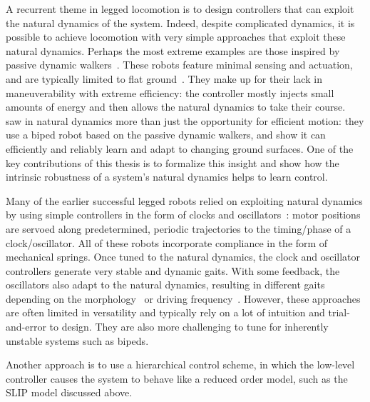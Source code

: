 
A recurrent theme in legged locomotion is to design controllers that can exploit the natural dynamics of the system. Indeed, despite complicated dynamics, it is possible to achieve locomotion with very simple approaches that exploit these natural dynamics.
Perhaps the most extreme examples are those inspired by passive dynamic walkers~\cite{mcgeer1990passive}. These robots feature minimal sensing and actuation, and are typically limited to flat ground~\cite{bhounsule2012design,wisse2006design}. They make up for their lack in maneuverability with extreme efficiency: the controller mostly injects small amounts of energy and then allows the natural dynamics to take their course.~\textcite{tedrake2005learning} saw in natural dynamics more than just the opportunity for efficient motion: they use a biped robot based on the passive dynamic walkers, and show it can efficiently and reliably learn and adapt to changing ground surfaces. One of the key contributions of this thesis is to formalize this insight and show how the intrinsic robustness of a system's natural dynamics helps to learn control. \par
Many of the earlier successful legged robots relied on exploiting natural dynamics by using simple controllers in the form of clocks and oscillators~\cite{sprowitz2013towards,buchli2006resonance,altendorfer2001rhex,owaki2013simple}: motor positions are servoed along predetermined, periodic trajectories to the timing/phase of a clock/oscillator. All of these robots incorporate compliance in the form of mechanical springs. Once tuned to the natural dynamics, the clock and oscillator controllers generate very stable and dynamic gaits. With some feedback, the oscillators also adapt to the natural dynamics, resulting in different gaits depending on the morphology~\cite{owaki2013simple} or driving frequency~\cite{owaki2013simple,owaki2017quadruped}. %
However, these approaches are often limited in versatility and typically rely on a lot of intuition and trial-and-error to design. They are also more challenging to tune for inherently unstable systems such as bipeds. \par
Another approach is to use a hierarchical control scheme, in which the low-level controller causes the system to behave like a reduced order model, such as the SLIP model discussed above.

